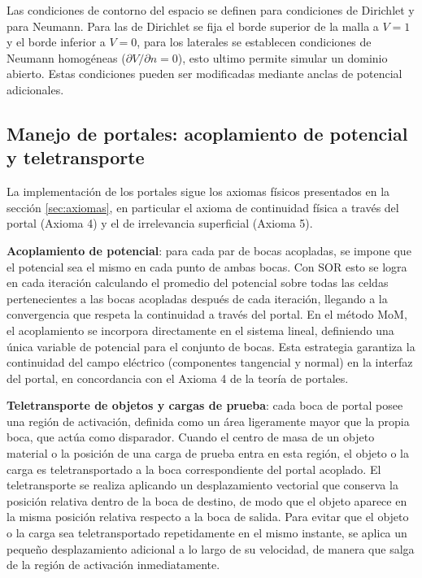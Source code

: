 \documentclass[12pt, twocolumn]{article}
\begin{document}
Las condiciones de contorno del espacio se definen para condiciones de Dirichlet y para Neumann. Para las de Dirichlet se fija el borde superior de la malla a $V=1$ y el borde inferior a $V=0$, para los laterales se establecen condiciones de Neumann homogéneas ($\partial V /\partial n = 0$), esto ultimo permite simular un dominio abierto. Estas condiciones pueden ser modificadas mediante anclas de potencial adicionales.

\subsection{Manejo de portales: acoplamiento de potencial y teletransporte}
\label{sec:teletransporte}

La implementación de los portales sigue los axiomas físicos presentados en la sección \ref{sec:axiomas}, en particular el axioma de continuidad física a través del portal (Axioma 4) y el de irrelevancia superficial (Axioma 5).

\textbf{Acoplamiento de potencial}: para cada par de bocas acopladas, se impone que el potencial sea el mismo en cada punto de ambas bocas. Con SOR esto se logra en cada iteración calculando el promedio del potencial sobre todas las celdas pertenecientes a las bocas acopladas después de cada iteración, llegando a la convergencia que respeta la continuidad a través del portal. En el método MoM, el acoplamiento se incorpora directamente en el sistema lineal, definiendo una única variable de potencial para el conjunto de bocas. Esta estrategia garantiza la continuidad del campo eléctrico (componentes tangencial y normal) en la interfaz del portal, en concordancia con el Axioma 4 de la teoría de portales.



\textbf{Teletransporte de objetos y cargas de prueba}: cada boca de portal posee una región de activación, definida como un área ligeramente mayor que la propia boca, que actúa como disparador. Cuando el centro de masa de un objeto material o la posición de una carga de prueba entra en esta región, el objeto o la carga es teletransportado a la boca correspondiente del portal acoplado. El teletransporte se realiza aplicando un desplazamiento vectorial que conserva la posición relativa dentro de la boca de destino, de modo que el objeto aparece en la misma posición relativa respecto a la boca de salida. Para evitar que el objeto o la carga sea teletransportado repetidamente en el mismo instante, se aplica un pequeño desplazamiento adicional a lo largo de su velocidad, de manera que salga de la región de activación inmediatamente.
\end{document}
